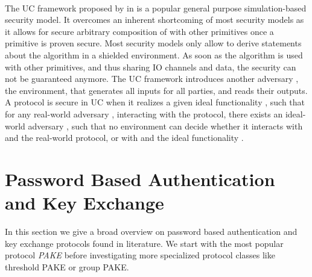 \paragraph{}
The \ac{UC} framework proposed by \citeauthor{Canetti2001a} \cite{Canetti2001a} in \citeyear{Canetti2001a} is a popular general purpose simulation-based security model.
It overcomes an inherent shortcoming of most security models as it allows for secure arbitrary composition of with other primitives once a primitive is proven secure.
Most security models only allow to derive statements about the algorithm in a shielded environment.
As soon as the algorithm is used with other primitives, and thus sharing \ac{IO} channels and data, the security can not be guaranteed anymore.
The \ac{UC} framework introduces another adversary \UCZ, the environment, that generates all inputs for all parties, and reads their outputs.
A protocol is secure in \ac{UC} when it realizes a given ideal functionality \UCF, such that for any real-world adversary \A, interacting with the protocol, there exists an ideal-world adversary \UCS, such that no environment \UCZ can decide whether it interacts with \A and the real-world protocol, or with \UCS and the ideal functionality \UCF.


\section{Password Based Authentication and Key Exchange}
In this section we give a broad overview on password based authentication and key exchange protocols found in literature.
We start with the most popular protocol \emph{\ac{PAKE}} before investigating more specialized protocol classes like threshold \ac{PAKE} or group \ac{PAKE}.

